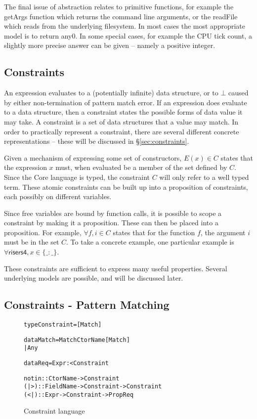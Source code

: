 \documentclass[preprint]{sigplanconf}
\newcommand{\C}[1]{\textsf{#1}}
\newenvironment{code}{\begin{alltt}\small}{\end{alltt}}
\newcommand{\g}[1]{\{#1\}} %
\begin{document}
The final issue of abstraction relates to primitive functions, for example the \C{getArgs} function which returns the command line arguments, or the \C{readFile} which reads from the underlying filesystem. In most cases the most appropriate model is to return \C{any0}. In some special cases, for example the CPU tick count, a slightly more precise answer can be given -- namely a positive integer.


\subsection{Constraints}

An expression evaluates to a (potentially infinite) data structure, or to $\bot{}$ caused by either non-termination of pattern match error. If an expression does evaluate to a data structure, then a constraint states the possible forms of data value it may take. A constraint is a set of data structures that a value may match. In order to practically represent a constraint, there are several different concrete representations -- these will be discussed in \S\ref{sec:constraints}.

Given a mechanism of expressing some set of constructors, $E(x) \in C$ states that the expression $x$ must, when evaluated be a member of the set defined by $C$. Since the Core language is typed, the constraint $C$ will only refer to a well typed term. These atomic constraints can be built up into a proposition of constraints, each possibly on different variables.

Since free variables are bound by function calls, it is possible to scope a constraint by making it a proposition. These can then be placed into a proposition. For example, $\forall f, i \in C$ states that for the function $f$, the argument $i$ must be in the set $C$. To take a concrete example, one particular example is $\forall \C{risers4}, x \in \g{\_ : \_}$.

These constraints are sufficient to express many useful properties. Several underlying models are possible, and will be discussed later.

\subsection{Constraints - Pattern Matching}

\begin{figure}
\begin{code}
type Constraint = [Match]

data Match  =  Match CtorName [Match]
            |  Any

data Req = Expr :< Constraint

notin :: CtorName -> Constraint
(|>) :: FieldName -> Constraint -> Constraint
(<|) :: Expr -> Constraint -> Prop Req
\end{code}
\caption{Constraint language}
\label{fig:constraint}
\end{figure}
\end{document}
